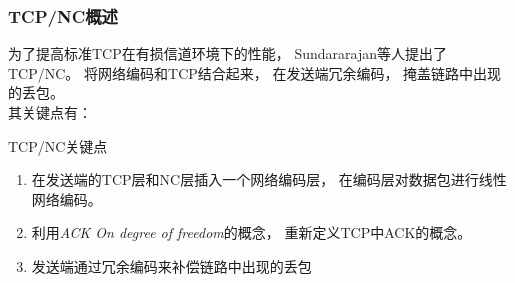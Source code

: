 \begin{frame}[t]
	\frametitle{TCP/NC概述}
	为了提高标准TCP在有损信道环境下的性能，
	Sundararajan等人提出了TCP/NC。
	将网络编码和TCP结合起来，
	在发送端冗余编码，
	掩盖链路中出现的丢包。
	\\
	其关键点有：
	\begin{block}{TCP/NC关键点}
		\begin{enumerate}
			\item 在发送端的TCP层和NC层插入一个网络编码层，
			在编码层对数据包进行线性网络编码。
			\item 利用\emph{ACK On degree of freedom}的概念，
			重新定义TCP中ACK的概念。
			\item 发送端通过冗余编码来补偿链路中出现的丢包
		\end{enumerate}
	\end{block}
\end{frame}

